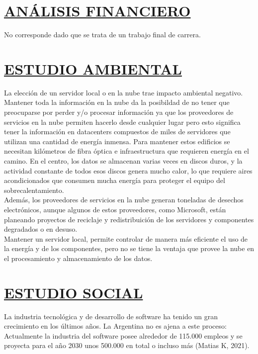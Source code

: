 \section*{\underline{ANÁLISIS FINANCIERO}}
No corresponde dado que se trata de un trabajo final de carrera.\\

\section*{\underline{ESTUDIO AMBIENTAL}}
La elección de un servidor local o en la nube trae impacto ambiental negativo.\\

Mantener toda la información en la nube da la posibildad de no tener que preocuparse por perder y/o procesar información ya que los proveedores de servicios en la nube permiten hacerlo desde cualquier lugar pero esto significa tener la información en datacenters compuestos de miles de servidores que utilizan una cantidad de energía inmensa. Para mantener estos edificios se necesitan kilómetros de fibra óptica e infraestructura que requieren energía en el camino. En el centro, los datos se almacenan varias veces en discos duros, y la actividad constante de todos esos discos genera mucho calor, lo que requiere aires acondicionados que consumen mucha energía para proteger el equipo del sobrecalentamiento.\\
Además, los proveedores de servicios en la nube generan toneladas de desechos electrónicos, aunque algunos de estos proveedores, como Microsoft, están planeando proyectos de reciclaje y redistribuición de los servidores y componentes degradados o en desuso.
\\

Mantener un servidor local, permite controlar de manera más eficiente el uso de la energía y de los componentes, pero no se tiene la ventaja que provee la nube en el procesamiento y almacenamiento de los datos.\\




\section*{\underline{ESTUDIO SOCIAL}}
La industria tecnológica y de desarrollo de software ha tenido un gran crecimiento en los últimos años. La Argentina no es ajena a este proceso: Actualmente la industria del software posee alrededor de 115.000 empleos y se proyecta para el año 2030 unos 500.000 en total o incluso más \textbf{\cite{EmpleosUltAnios}}(Matias K, 2021).\\

